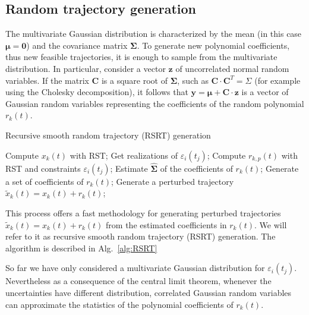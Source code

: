 \subsection{Random trajectory generation}
The multivariate Gaussian distribution is characterized by the mean (in this case $\mathbf{\mu} = \mathbf{0}$) and the covariance matrix $\mathbf{\Sigma}$. To generate new polynomial coefficients, thus new feasible trajectories, it is enough to sample from the multivariate distribution. In particular, consider a vector $\mathbf{z}$ of uncorrelated normal random variables. If the matrix $\mathbf{C}$ is a square root of $\mathbf{\Sigma}$, such as $\mathbf{C}\cdot \mathbf{C}^T = \Sigma$ (for example using the Cholesky decomposition), it follows that $\mathbf{y}=\mathbf{\mu} + \mathbf{C}\cdot \mathbf{z}$ is a vector of Gaussian random variables representing the coefficients of the random polynomial $r_k(t)$.


\begin{algorithm}
\caption{Recursive smooth random trajectory (RSRT) generation}
\label{alg:RSRT}
\begin{algorithmic}[1]
\State Compute $x_k(t)$ with RST;
		\State Get realizations of $\varepsilon_i(t_j)$;
		\State Compute $r_{k,p}(t)$ with RST and constraints $\varepsilon_i(t_j)$;
	\EndFor
	\State Estimate $\mathbf{\hat{\Sigma}}$ of the coefficients of $r_k(t)$;
	\State Generate a set of coefficients of $r_k(t)$;
		\State Generate a perturbed trajectory $\tilde{x}_k(t)=x_k(t)+r_k(t)$;
\end{algorithmic}
\end{algorithm}

This process offers a fast methodology for generating perturbed trajectories $\tilde{x}_k(t)=x_k(t)+r_k(t)$ from the estimated coefficients in $r_k(t)$. We will refer to it as recursive smooth random trajectory (RSRT) generation. The algorithm is described in Alg.~\ref{alg:RSRT}

So far we have only considered a multivariate Gaussian distribution for $\varepsilon_i(t_j)$. Nevertheless as a consequence of the central limit theorem, whenever the uncertainties have different distribution, correlated Gaussian random variables can approximate the statistics of the polynomial coefficients of $r_k(t)$.